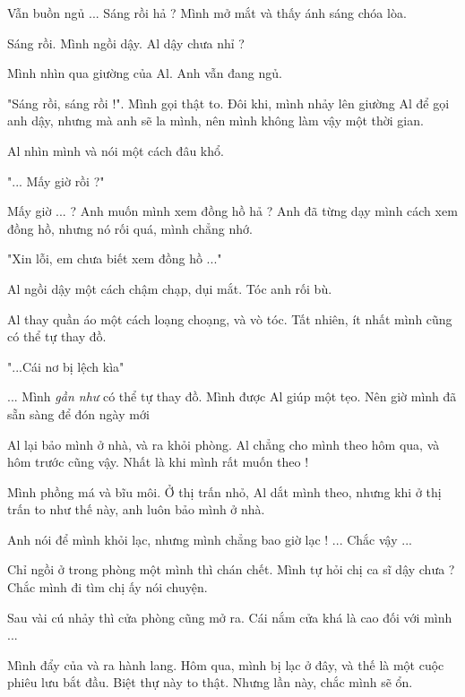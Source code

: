 
Vẫn buồn ngủ ... Sáng rồi hả ? Mình mở mắt và thấy ánh sáng chóa lòa. 

Sáng rồi. Mình ngồi dậy. Al dậy chưa nhỉ ?

Mình nhìn qua giường của Al. Anh vẫn đang ngủ.

"Sáng rồi, sáng rồi !". Mình gọi thật to. Đôi khi, mình nhảy lên giường Al để gọi anh dậy, nhưng mà anh sẽ la mình, nên mình không làm vậy một thời gian.

Al nhìn mình và nói một cách đâu khổ.

"... Mấy giờ rồi ?"

Mấy giờ ... ? Anh muốn mình xem đồng hồ hả ? Anh đã từng dạy mình cách xem đồng hồ, nhưng nó rối quá, mình chẳng nhớ.

"Xin lỗi, em chưa biết xem đồng hồ ..."

Al ngồi dậy một cách chậm chạp, dụi mắt. Tóc anh rối bù.

Al thay quần áo một cách loạng choạng, và vò tóc. Tất nhiên, ít nhất mình cũng có thể tự thay đồ.

"...Cái nơ bị lệch kìa"

... Mình \textit{gần như} có thể tự thay đồ. Mình được Al giúp một tẹo. Nên giờ mình đã sẵn sàng để đón ngày mới

Al lại bảo mình ở nhà, và ra khỏi phòng. Al chẳng cho mình theo hôm qua, và hôm trước cũng vậy. Nhất là khi mình rất muốn theo !

Mình phồng má và bĩu môi. Ở thị trấn nhỏ, Al dắt mình theo, nhưng khi ở thị trấn to như thế này, anh luôn bảo mình ở nhà.

Anh nói để mình khỏi lạc, nhưng mình chẳng bao giờ lạc ! ... Chắc vậy ...

Chỉ ngồi ở trong phòng một mình thì chán chết. Mình tự hỏi chị ca sĩ dậy chưa ? Chắc mình đi tìm chị ấy nói chuyện.

Sau vài cú nhảy thì cửa phòng cũng mở ra. Cái nắm cửa khá là cao đối với mình ...

Mình đẩy của và ra hành lang. Hôm qua, mình bị lạc ở đây, và thế là một cuộc phiêu lưu bắt đầu. Biệt thự này to thật. Nhưng lần này, chắc mình sẽ ổn.

